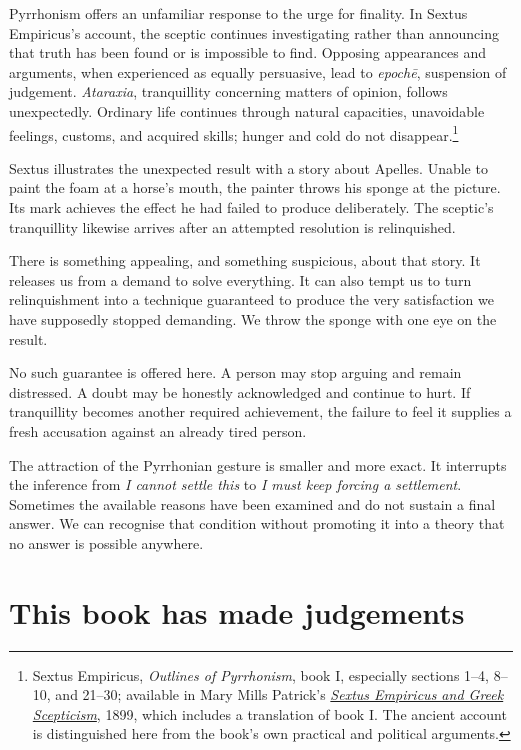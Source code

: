 \documentclass[12pt,a4paper]{book}
\begin{document}
Pyrrhonism offers an unfamiliar response to the urge for finality. In Sextus Empiricus's account, the sceptic continues investigating rather than announcing that truth has been found or is impossible to find. Opposing appearances and arguments, when experienced as equally persuasive, lead to \emph{epochē}, suspension of judgement. \emph{Ataraxia}, tranquillity concerning matters of opinion, follows unexpectedly. Ordinary life continues through natural capacities, unavoidable feelings, customs, and acquired skills; hunger and cold do not disappear.\footnote{Sextus Empiricus, \emph{Outlines of Pyrrhonism}, book I, especially sections 1--4, 8--10, and 21--30; available in Mary Mills Patrick's \href{https://www.gutenberg.org/files/17556/17556-h/17556-h.htm}{\emph{Sextus Empiricus and Greek Scepticism}}, 1899, which includes a translation of book I. The ancient account is distinguished here from the book's own practical and political arguments.}

Sextus illustrates the unexpected result with a story about Apelles. Unable to paint the foam at a horse's mouth, the painter throws his sponge at the picture. Its mark achieves the effect he had failed to produce deliberately. The sceptic's tranquillity likewise arrives after an attempted resolution is relinquished.

There is something appealing, and something suspicious, about that story. It releases us from a demand to solve everything. It can also tempt us to turn relinquishment into a technique guaranteed to produce the very satisfaction we have supposedly stopped demanding. We throw the sponge with one eye on the result.

No such guarantee is offered here. A person may stop arguing and remain distressed. A doubt may be honestly acknowledged and continue to hurt. If tranquillity becomes another required achievement, the failure to feel it supplies a fresh accusation against an already tired person.

The attraction of the Pyrrhonian gesture is smaller and more exact. It interrupts the inference from \emph{I cannot settle this} to \emph{I must keep forcing a settlement}. Sometimes the available reasons have been examined and do not sustain a final answer. We can recognise that condition without promoting it into a theory that no answer is possible anywhere.

\section*{This book has made judgements}
\end{document}
